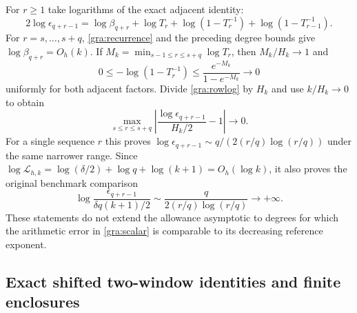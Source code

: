 \documentclass[11pt,a4paper]{article}
\begin{document}
For $r\ge1$ take logarithms of the exact adjacent identity:
\begin{equation}
 2\log\epsilon_{q+r-1}
 =\log\beta_{q+r}+\log T_r
 +\log(1-T_r^{-1})+\log(1-T_{r-1}^{-1}).
 \tag{GRA21}\label{gra:rowlog}
\end{equation}
For $r=s,\ldots,s+q$, \eqref{gra:recurrence} and the preceding degree
bounds give $\log\beta_{q+r}=O_h(k)$.  If
$M_k=\min_{s-1\le r\le s+q}\log T_r$, then $M_k/H_k\to1$ and
\[
 0\le-\log(1-T_r^{-1})
 \le\frac{e^{-M_k}}{1-e^{-M_k}}\longrightarrow0
\]
uniformly for both adjacent factors.  Divide \eqref{gra:rowlog} by
$H_k$ and use $k/H_k\to0$ to obtain
\begin{equation}
 \max_{s\le r\le s+q}
 \left|\frac{\log\epsilon_{q+r-1}}{H_k/2}-1\right|\longrightarrow0.
 \tag{GRA22}\label{gra:uniformeps}
\end{equation}
For a single sequence $r$ this proves
$\log\epsilon_{q+r-1}\sim q/(2(r/q)\log(r/q))$ under the same narrower
range.  Since
$\log\mathcal L_{h,k}=\log(\delta/2)+\log q+\log(k+1)=O_h(\log k)$,
it also proves the original benchmark comparison
\begin{equation}
 \log\frac{\epsilon_{q+r-1}}{\delta q(k+1)/2}
 \sim\frac{q}{2(r/q)\log(r/q)}\longrightarrow+\infty.
 \tag{GRA23}\label{gra:epsbenchmark}
\end{equation}
These statements do not extend the allowance asymptotic to degrees for
which the arithmetic error in \eqref{gra:scalar} is comparable to its
decreasing reference exponent.

\subsection{Exact shifted two-window identities and finite enclosures}
\end{document}
